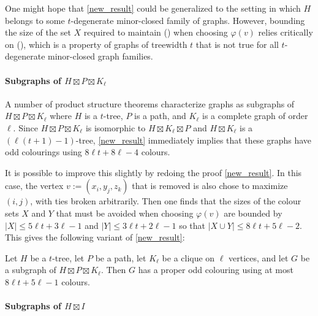 \documentclass{patmorin}
\begin{document}
One might hope that \cref{new_result} could be generalized to the setting in which $H$ belongs to some $t$-degenerate minor-closed family of graphs.  However, bounding the size of the set $X$ required to maintain () when choosing $\varphi(v)$ relies critically on (), which is a property of graphs of treewidth $t$ that is not true for all $t$-degenerate minor-closed graph families.

\paragraph{Subgraphs of $H\boxtimes P\boxtimes K_\ell$}

A number of product structure theorems characterize graphs as subgraphs of $H\boxtimes P\boxtimes K_{\ell}$ where $H$ is a $t$-tree, $P$ is a path, and $K_\ell$ is a complete graph of order $\ell$.  Since $H\boxtimes P\boxtimes K_{\ell}$ is isomorphic to $H\boxtimes K_\ell\boxtimes P$ and $H\boxtimes K_\ell$ is a $(\ell(t+1)-1)$-tree, \cref{new_result} immediately implies that these graphs have odd colourings using $8\ell t+8\ell-4$ colours.

It is possible to improve this slightly by redoing the proof \cref{new_result}.  In this case, the vertex $v:=(x_i,y_j,z_k)$ that is removed is also chose to maximize $(i,j)$, with ties broken arbitrarily. Then one finds that the sizes of the colour sets $X$ and $Y$ that must be avoided when choosing $\varphi(v)$ are bounded by $|X|\le 5\ell t + 3\ell-1$ and $|Y|\le 3\ell t + 2\ell -1$ so that $|X\cup Y|\le 8\ell t + 5\ell -2$. This gives the following variant of \cref{new_result}:

\begin{thm}\label{new_result_kl}
  Let $H$ be a $t$-tree, let $P$ be a path, let $K_\ell$ be a clique on $\ell$ vertices, and let $G$ be a subgraph of $H\boxtimes P\boxtimes K_\ell$.  Then $G$ has a proper odd colouring using at most $8\ell t + 5\ell -1$ colours.
\end{thm}

\paragraph{Subgraphs of $H\boxtimes I$}
\end{document}
